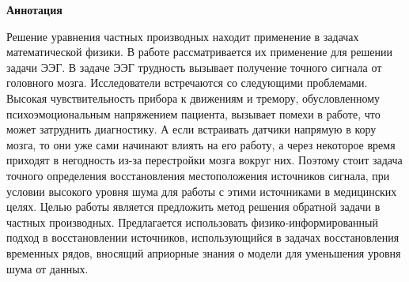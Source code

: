 \begin{center}
    \Large{\textbf{Аннотация}}
\end{center}

\begin{singlespace}

Решение уравнения частных производных находит применение в задачах математической физики.
В работе рассматривается их применение для решении задачи ЭЭГ. В задаче ЭЭГ трудность 
вызывает получение точного сигнала от головного мозга. Исследователи встречаются со следующими проблемами. 
Высокая чувствительность прибора к движениям и тремору, обусловленному психоэмоциональным напряжением пациента, 
вызывает помехи в работе, что может затруднить диагностику. 
А если встраивать датчики напрямую в кору мозга, то они уже сами начинают влиять на его работу, 
а через некоторое время приходят в негодность из-за перестройки мозга вокруг них. Поэтому 
стоит задача точного определения восстановления местоположения источников сигнала, 
при условии высокого уровня шума для работы с этими источниками в медицинских целях.
Целью работы является предложить метод решения обратной задачи в частных производных.
Предлагается использовать физико-информированный подход в восстановлении источников, 
использующийся в задачах восстановления временных рядов, вносящий априорные знания 
о модели для уменьшения уровня шума от данных.
\end{singlespace}
